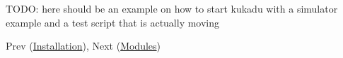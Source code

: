 T\+O\+DO\+: here should be an example on how to start kukadu with a simulator example and a test script that is actually moving

Prev (\hyperlink{installationpage}{Installation}), Next (\hyperlink{modulespage}{Modules}) 